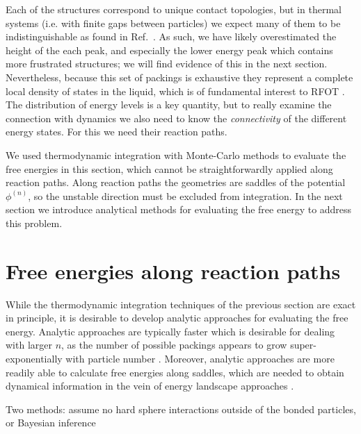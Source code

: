 \documentclass[11pt,twoside]{report}
\begin{document}
Each of the structures correspond to unique contact topologies, but in thermal systems (i.e. with finite gaps between particles) we expect many of them to be indistinguishable as found in Ref.\ \cite{TrombachPRE2018}.
As such, we have likely overestimated the height of the each peak, and especially the lower energy peak which contains more frustrated structures; we will find evidence of this in the next section.
Nevertheless, because this set of packings is exhaustive they represent a complete local density of states in the liquid, which is of fundamental interest to RFOT \cite{LubchenkoARPC2007}.
The distribution of energy levels is a key quantity, but to really examine the connection with dynamics we also need to know the \emph{connectivity} of the different energy states.
For this we need their reaction paths.

We used thermodynamic integration with Monte-Carlo methods to evaluate the free energies in this section, which cannot be straightforwardly applied along reaction paths.
Along reaction paths the geometries are saddles of the potential $\phi^{(n)}$, so the unstable direction must be excluded from integration.
In the next section we introduce analytical methods for evaluating the free energy to address this problem.


\section{Free energies along reaction paths}
\label{sec:reaction-paths}

While the thermodynamic integration techniques of the previous section are exact in principle, it is desirable to develop analytic approaches for evaluating the free energy.
Analytic approaches are typically faster which is desirable for dealing with larger $n$, as the number of possible packings appears to grow super-exponentially with particle number \cite{Holmes-CerfonSR2016}.
Moreover, analytic approaches are more readily able to calculate free energies along saddles, which are needed to obtain dynamical information in the vein of energy landscape approaches \cite{Wales2004}.

Two methods: assume no hard sphere interactions outside of the bonded particles, or Bayesian inference
\end{document}
